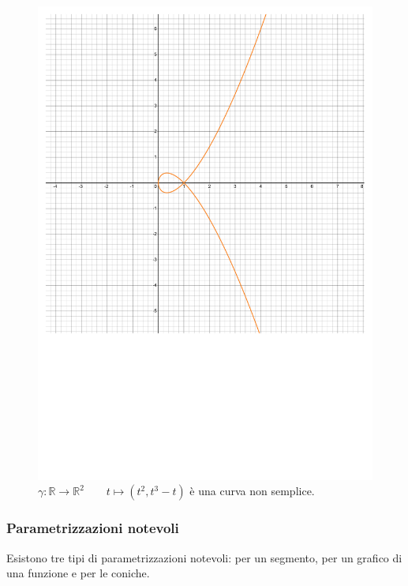 \documentclass[a4paper]{article}
\begin{document}
	\begin{figure}[!htp]
		\centering
		\includegraphics[width=.8\textwidth]{img/parametrizzazioni-3.pdf}
		\caption*{$\gamma: \mathbb{R} \rightarrow \mathbb{R}^{2} \hspace{2em} t\mapsto\left(t^{2}, t^{3}-t\right)$ è una curva non semplice.}
	\end{figure}\newpage

	\subsubsection{Parametrizzazioni notevoli}\label{subsubsection: parametrizzazioni notevoli}

	Esistono tre tipi di parametrizzazioni notevoli: per un segmento, per un grafico di una funzione e per le coniche.
\end{document}

